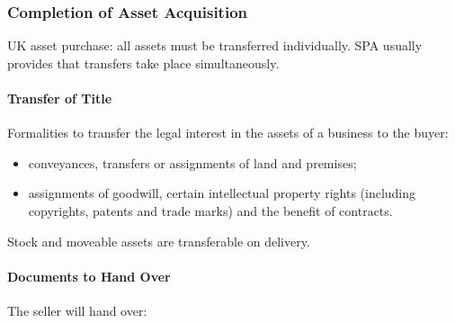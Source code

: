 \documentclass[
]{article}
\providecommand{\tightlist}{%
  \setlength{\itemsep}{0pt}\setlength{\parskip}{0pt}}
\begin{document}
\hypertarget{completion-of-asset-acquisition}{%
\subsubsection{Completion of Asset
Acquisition}\label{completion-of-asset-acquisition}}

UK asset purchase: all assets must be transferred individually. SPA
usually provides that transfers take place simultaneously.

\hypertarget{transfer-of-title}{%
\paragraph{Transfer of Title}\label{transfer-of-title}}

Formalities to transfer the legal interest in the assets of a business
to the buyer:

\begin{itemize}
\tightlist
\item
  conveyances, transfers or assignments of land and premises;
\item
  assignments of goodwill, certain intellectual property rights
  (including copyrights, patents and trade marks) and the benefit of
  contracts.
\end{itemize}

Stock and moveable assets are transferable on delivery.

\hypertarget{documents-to-hand-over}{%
\paragraph{Documents to Hand Over}\label{documents-to-hand-over}}

The seller will hand over:
\end{document}
